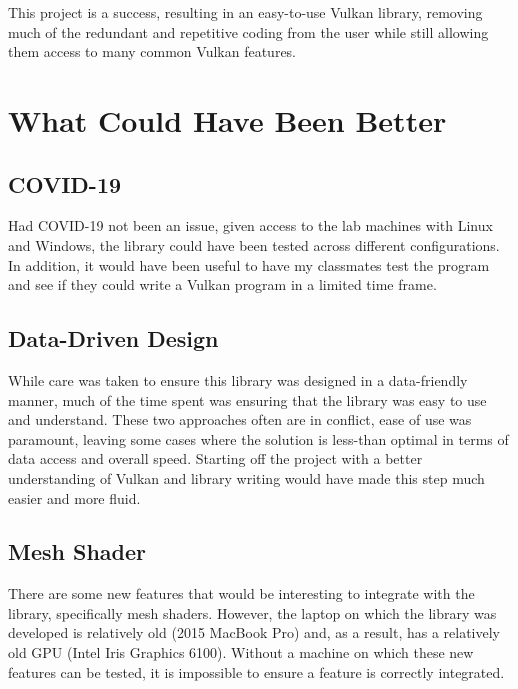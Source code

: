 \documentclass[12pt]{report}
\theoremstyle{definition}
\begin{document}
    This project is a success, resulting in an easy-to-use Vulkan library,
    removing much of the redundant and repetitive coding from the user
    while still allowing them access to many common Vulkan features.

    \section{What Could Have Been Better}

     \subsection{COVID-19}

      Had COVID-19 not been an issue, given access to the lab machines with
      Linux and Windows, the library could have been tested across different
      configurations. In addition, it would have been useful to have my
      classmates test the program and see if they could write a Vulkan
      program in a limited time frame.

    \subsection{Data-Driven Design}

      While care was taken to ensure this library was designed in a data-friendly
      manner, much of the time spent was ensuring that the library was easy to
      use and understand. These two approaches often are in conflict, ease of
      use was paramount, leaving some cases where the solution is less-than
      optimal in terms of data access and overall speed. Starting off the
      project with a better understanding of Vulkan and library writing
      would have made this step much easier and more fluid.

    \subsection{Mesh Shader}

      There are some new features that would be interesting to integrate with
      the library, specifically mesh shaders. However, the laptop on which
      the library was developed is relatively old (2015 MacBook Pro) and,
      as a result, has a relatively old GPU (Intel Iris Graphics 6100).
      Without a machine on which these new features can be tested, it
      is impossible to ensure a feature is correctly integrated.
\end{document}
